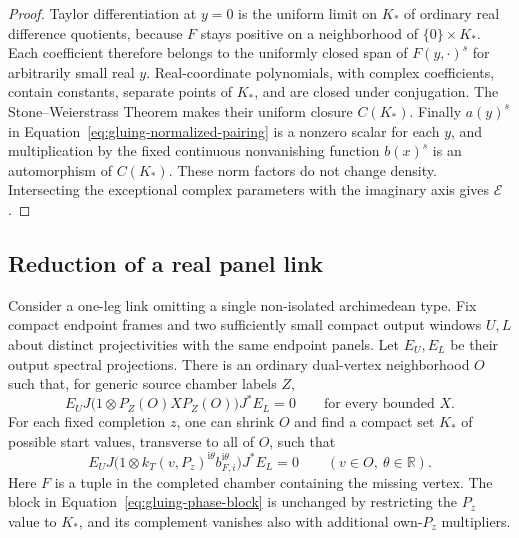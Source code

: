 \begin{proof}
Taylor differentiation at $y=0$ is the uniform limit on $K_*$ of
ordinary real difference quotients, because $F$ stays positive on
a neighborhood of $\{0\}\times K_*$.  Each coefficient therefore
belongs to the uniformly closed span of $F(y,\cdot)^s$ for
arbitrarily small real $y$.  Real-coordinate polynomials, with
complex coefficients, contain constants, separate points of $K_*$,
and are closed under conjugation.  The Stone--Weierstrass Theorem
makes their uniform closure $C(K_*)$.  Finally $a(y)^s$ in
Equation~\eqref{eq:gluing-normalized-pairing} is a nonzero scalar
for each $y$, and multiplication by the fixed continuous
nonvanishing function $b(x)^s$ is an automorphism of $C(K_*)$.
These norm factors do not change density.  Intersecting the
exceptional complex parameters with the imaginary axis gives
$\mathcal E$.
\end{proof}

\subsection{Reduction of a real panel link}

\begin{lemma}
\label{lem:gluing-separated-blocks}
Consider a one-leg link omitting a single non-isolated
archimedean type.  Fix compact endpoint frames and two sufficiently
small compact output windows $U,L$ about distinct projectivities
with the same endpoint panels.  Let $E_U,E_L$ be their output
spectral projections.  There is an ordinary dual-vertex
neighborhood $O$ such that, for generic source chamber labels $Z$,
\begin{equation}
 \label{eq:input-26}
 E_UJ\bigl(1\otimes P_Z(O)X P_Z(O)\bigr)J^*E_L=0
 \qquad\text{for every bounded }X.
\end{equation}
For each fixed completion $z$, one can shrink $O$ and find a
compact set $K_*$ of possible start values, transverse to all of
$O$, such that
\begin{equation}
 \label{eq:gluing-phase-block}
 E_UJ\bigl(1\otimes
     k_T(v,P_z)^{\mathrm i\theta}b_{F,i}^{\mathrm i\theta}
                 \bigr)J^*E_L=0
 \qquad(v\in O,\ \theta\in\mathbb R).
\end{equation}
Here $F$ is a tuple in the completed chamber containing the missing
vertex.  The block in Equation~\eqref{eq:gluing-phase-block} is
unchanged by restricting the $P_z$ value to $K_*$, and its
complement vanishes also with additional own-$P_z$ multipliers.
\end{lemma}

